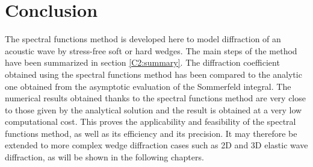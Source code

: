 \section*{Conclusion}
The spectral functions method is developed here to model diffraction of an acoustic wave by stress-free soft or hard wedges. The main steps of the method have been summarized in section \ref{C2:summary}. The diffraction coefficient obtained using the spectral functions method has been compared to the analytic one obtained from the asymptotic evaluation of the Sommerfeld integral. The numerical results obtained thanks to the spectral functions method are very close to those given by the analytical solution and the result is obtained at a very low computational cost. This proves the applicability and feasibility of the spectral functions method, as well as its efficiency and its precision. It may therefore be extended to more complex wedge diffraction cases such as 2D and 3D elastic wave diffraction, as will be shown in the following chapters. 
